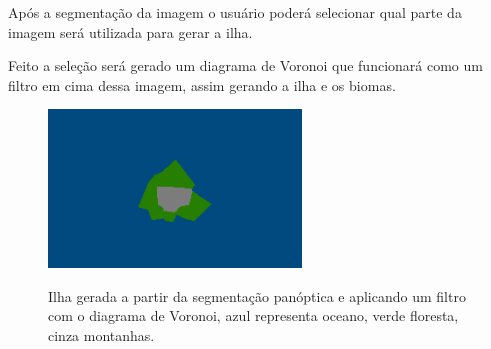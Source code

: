 Após a segmentação da imagem o usuário poderá selecionar qual parte da imagem será utilizada para gerar a ilha.

Feito a seleção será gerado um diagrama de Voronoi que funcionará como um filtro em cima dessa imagem, assim gerando a ilha e os biomas.

\begin{figure}[!ht]
	\centering
    \caption{Ilha gerada a partir da segmentação panóptica e aplicando um filtro com o diagrama de Voronoi, azul representa oceano, verde floresta, cinza montanhas.}
	\includegraphics[width=0.6\textwidth]{figures/segmantations_pnl.png}
	\label{fig:segmantations_pnl}
\end{figure}

